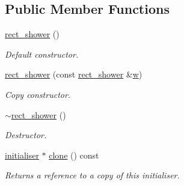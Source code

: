\subsection*{Public Member Functions}
\begin{DoxyCompactItemize}
\item 
\mbox{\label{classphysim_1_1init_1_1rect__shower_ae2316c75cc0c0e6ea32b4875405315d9}} 
\hyperlink{classphysim_1_1init_1_1rect__shower_ae2316c75cc0c0e6ea32b4875405315d9}{rect\+\_\+shower} ()
\begin{DoxyCompactList}\small\item\em Default constructor. \end{DoxyCompactList}\item 
\mbox{\label{classphysim_1_1init_1_1rect__shower_a7b2ee923b808fe9587d9afa33141129d}} 
\hyperlink{classphysim_1_1init_1_1rect__shower_a7b2ee923b808fe9587d9afa33141129d}{rect\+\_\+shower} (const \hyperlink{classphysim_1_1init_1_1rect__shower}{rect\+\_\+shower} \&\hyperlink{classphysim_1_1init_1_1rect__source_a4a7f1402b417e2217ab3724e6e55c18b}{w})
\begin{DoxyCompactList}\small\item\em Copy constructor. \end{DoxyCompactList}\item 
\mbox{\label{classphysim_1_1init_1_1rect__shower_aa1fc16c97deb04c5be1faa64e63ebb36}} 
\hyperlink{classphysim_1_1init_1_1rect__shower_aa1fc16c97deb04c5be1faa64e63ebb36}{$\sim$rect\+\_\+shower} ()
\begin{DoxyCompactList}\small\item\em Destructor. \end{DoxyCompactList}\item 
\mbox{\label{classphysim_1_1init_1_1rect__shower_ac3fe693d39154dba3b021da0a247703d}} 
\hyperlink{classphysim_1_1init_1_1initialiser}{initialiser} $\ast$ \hyperlink{classphysim_1_1init_1_1rect__shower_ac3fe693d39154dba3b021da0a247703d}{clone} () const
\begin{DoxyCompactList}\small\item\em Returns a reference to a copy of this initialiser. \end{DoxyCompactList}\end{DoxyCompactItemize}

